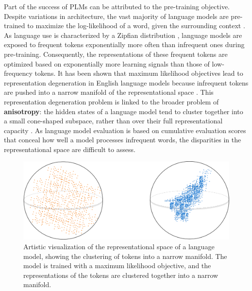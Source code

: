 Part of the success of PLMs can be attributed to the pre-training objective. Despite variations in architecture, the vast majority of language models are pre-trained to maximize the log-likelihood of a word, given the surrounding context \citep{devlin2019bert, brown2020gpt3, chowdhery2023palm, touvron2023llama}. As language use is characterized by a Zipfian distribution \citep{zipf1935zipflaw}, language models are exposed to frequent tokens exponentially more often than infrequent ones during pre-training. Consequently, the representations of these frequent tokens are optimized based on exponentially more learning signals than those of low-frequency tokens. It has been shown that maximum likelihood objectives lead to representation degeneration in English language models because infrequent tokens are pushed into a narrow manifold of the representational space \citep{gao2018representation}. This representation degeneration problem is linked to the broader problem of \textbf{anisotropy}: the hidden states of a language model tend to cluster together into a small cone-shaped subspace, rather than over their full representational capacity \citep{arora2016latent, ethayarajh2019contextual, gao2018representation}. As language model evaluation is based on cumulative evaluation scores that conceal how well a model processes infrequent words, the disparities in the representational space are difficult to assess.  


\begin{figure}[ht!]
    \centering
    \includegraphics[width=0.8\linewidth]{chapters/syntatic-smoothing/figures/anisotropy_visualization.pdf}
    \caption{Artistic visualization of the representational space of a language model, showing the clustering of tokens into a narrow manifold. The model is trained with a maximum likelihood objective, and the representations of the tokens are clustered together into a narrow manifold.}
    \label{fig:anisotropy_visualization}
\end{figure}


